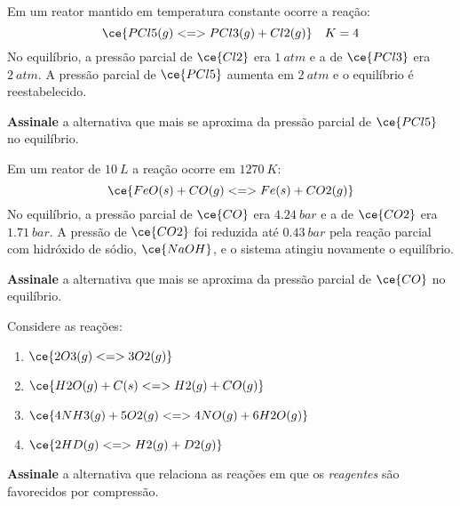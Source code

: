 \begin{problem}[
	id={2F31},
	path={/home/braun/Documents/Developer/braunchem/data/problems/Q2/2F/2F31}
]
Em um reator mantido em temperatura constante ocorre a reação: {\[
    \ce{ PCl5(g) <=> PCl3(g) + Cl2(g) } \quad K = 4
\]} No equilíbrio, a pressão parcial de {\(\ce{Cl2}\)} era {\(\qty{1}{\unit{atm}}\)} e a de {\(\ce{PCl3}\)} era {\(\qty{2}{\unit{atm}}\)}. A pressão
parcial de {\(\ce{PCl5}\)} aumenta em {\(\qty{2}{\unit{atm}}\)} e o equilíbrio é reestabelecido.

\textbf{Assinale} a alternativa que mais se aproxima da pressão parcial de {\(\ce{PCl5}\)} no equilíbrio.
\end{problem}


\begin{problem}[
	id={2F32},
	path={/home/braun/Documents/Developer/braunchem/data/problems/Q2/2F/2F32}
]
Em um reator de {\(\qty{10}{\unit{L}}\)} a reação ocorre em {\(\qty{1270}{\unit{K}}\)}: {\[
    \ce{ FeO(s) + CO(g) <=> Fe(s) + CO2(g) }
\]} No equilíbrio, a pressão parcial de {\(\ce{CO}\)} era {\(\qty{4,24}{\unit{bar}}\)} e a de {\(\ce{CO2}\)} era {\(\qty{1,71}{\unit{bar}}\)}. A
pressão de {\(\ce{CO2}\)} foi reduzida até {\(\qty{0,43}{\unit{bar}}\)} pela reação parcial com hidróxido de sódio, {\(\ce{NaOH}\)}, e o sistema
atingiu novamente o equilíbrio.

\textbf{Assinale} a alternativa que mais se aproxima da pressão parcial de {\(\ce{CO}\)} no equilíbrio.
\end{problem}


\begin{problem}[
	id={2F33},
	path={/home/braun/Documents/Developer/braunchem/data/problems/Q2/2F/2F33}
]
Considere as reações:

\begin{enumerate}
\def\labelenumi{\arabic{enumi}.}
\tightlist
\item
  {\(\ce{ 2 O3(g) <=> 3 O2(g) }\)}
\item
  {\(\ce{ H2O(g) + C(s) <=> H2(g) + CO(g) }\)}
\item
  {\(\ce{ 4 NH3(g) + 5 O2(g) <=> 4 NO(g) + 6 H2O(g) }\)}
\item
  {\(\ce{ 2 HD(g) <=> H2(g) + D2(g) }\)}
\end{enumerate}

\textbf{Assinale} a alternativa que relaciona as reações em que os \emph{reagentes} são favorecidos por compressão.
\end{problem}


